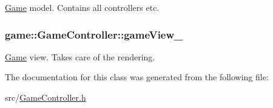 \hyperlink{classgame_1_1Game}{\-Game} model. \-Contains all controllers etc. 

\hypertarget{classgame_1_1GameController_afe6a25ef2102a7baab0dd16e1b0d23af}{
\subsubsection[{game\-View\-\_\-}]{ {\bf game\-::\-Game\-Controller\-::game\-View\-\_\-}}}\label{d6/d98/classgame_1_1GameController_afe6a25ef2102a7baab0dd16e1b0d23af}


\hyperlink{classgame_1_1Game}{\-Game} view. \-Takes care of the rendering. 



\-The documentation for this class was generated from the following file\-:\begin{DoxyCompactItemize}
\item 
src/\hyperlink{GameController_8h}{\-Game\-Controller.\-h}\end{DoxyCompactItemize}
